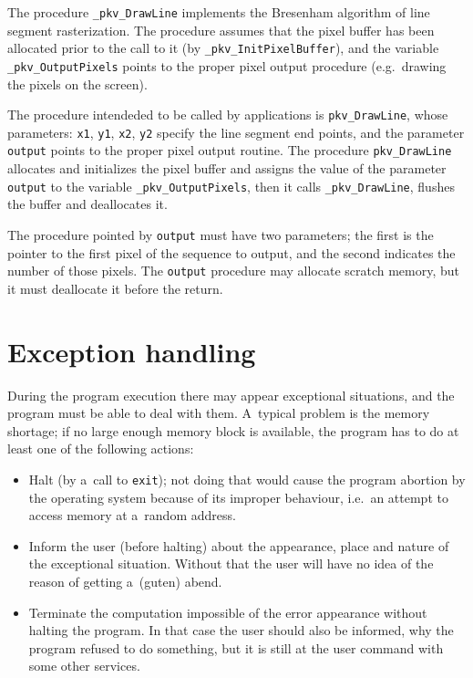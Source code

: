 \vspace{\bigskipamount}                              
The procedure \texttt{\_pkv\_DrawLine} implements the Bresenham algorithm of
line segment rasterization. The procedure assumes that the pixel buffer
has been allocated prior to the call to it
(by \texttt{\_pkv\_InitPixelBuffer}),
and the variable \texttt{\_pkv\_OutputPixels} points to the proper pixel
output procedure (e.g.\ drawing the pixels on the screen).

The procedure intendeded to be called by applications is
\texttt{pkv\_DrawLine}, whose parameters: \texttt{x1}, \texttt{y1},
\texttt{x2}, \texttt{y2} specify the line segment end points,
and the parameter \texttt{output} points to the proper pixel output
routine. The procedure \texttt{pkv\_DrawLine} allocates and initializes the
pixel buffer and assigns the value of the parameter \texttt{output}
to the variable \texttt{\_pkv\_OutputPixels},
then it calls \texttt{\_pkv\_DrawLine}, flushes the buffer and deallocates it.

The procedure pointed by \texttt{output} must have two parameters;
the first is the pointer to the first pixel of the sequence to output,
and the second indicates the number of those pixels. The \texttt{output}
procedure may allocate scratch memory, but it must deallocate it before
the return.


\newpage
\section{Exception handling}

During the program execution there may appear exceptional situations,
and the program must be able to deal with them. A~typical problem
is the memory shortage; if no large enough memory block is available,
the program has to do at least one of the following actions:
\begin{itemize}
\item Halt (by a~call to \texttt{exit}); not doing that would cause
  the program abortion by the operating system because of its improper behaviour,
  i.e.\ an attempt to access memory at a~random address.
\item Inform the user (before halting) about the appearance,
  place and nature of the exceptional situation. Without that the user
  will have no idea of the reason of getting a~(guten) abend.
\item Terminate the computation impossible of the error appearance
  without halting the program. In that case the user should also be
  informed, why the program refused to do something, but it is still at the
  user command with some other services.
\end{itemize}

